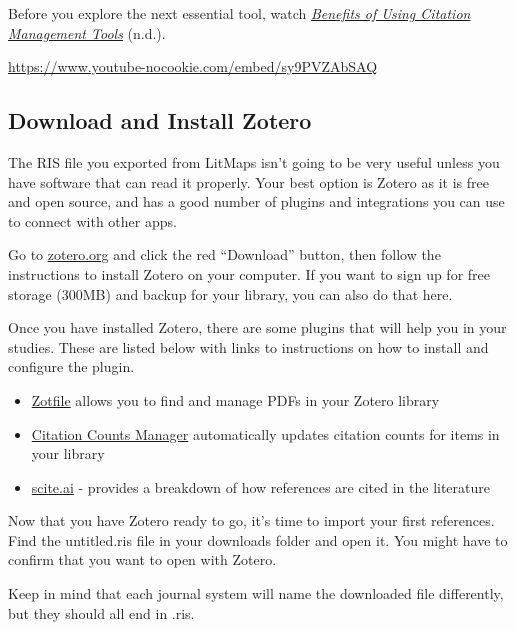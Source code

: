 \documentclass[
  letterpaper,
  DIV=11,
  numbers=noendperiod]{scrreprt}
\providecommand{\tightlist}{%
  \setlength{\itemsep}{0pt}\setlength{\parskip}{0pt}}\usepackage{longtable,booktabs,array}
\begin{document}
Before you explore the next essential tool, watch
\href{https://youtu.be/sy9PVZAbSAQ}{\emph{Benefits of Using Citation
Management Tools}} (n.d.).

\url{https://www.youtube-nocookie.com/embed/sy9PVZAbSAQ}

\subsection*{Download and Install
Zotero}\label{download-and-install-zotero}

The RIS file you exported from LitMaps isn't going to be very useful
unless you have software that can read it properly. Your best option is
Zotero as it is free and open source, and has a good number of plugins
and integrations you can use to connect with other apps.

Go to \href{https://zotero.org}{zotero.org} and click the red
``Download'' button, then follow the instructions to install Zotero on
your computer. If you want to sign up for free storage (300MB) and
backup for your library, you can also do that here.

Once you have installed Zotero, there are some plugins that will help
you in your studies. These are listed below with links to instructions
on how to install and configure the plugin.

\begin{itemize}
\tightlist
\item
  \href{http://zotfile.com/\#how-to-install--set-up-zotfile}{Zotfile}
  allows you to find and manage PDFs in your Zotero library
\item
  \href{https://github.com/eschnett/zotero-citationcounts\#installing}{Citation
  Counts Manager} automatically updates citation counts for items in
  your library
\item
  \href{https://github.com/scitedotai/scite-zotero-plugin\#installation}{scite.ai}
  - provides a breakdown of how references are cited in the literature
\end{itemize}

Now that you have Zotero ready to go, it's time to import your first
references. Find the untitled.ris file in your downloads folder and open
it. You might have to confirm that you want to open with Zotero.

Keep in mind that each journal system will name the downloaded file
differently, but they should all end in .ris.
\end{document}
